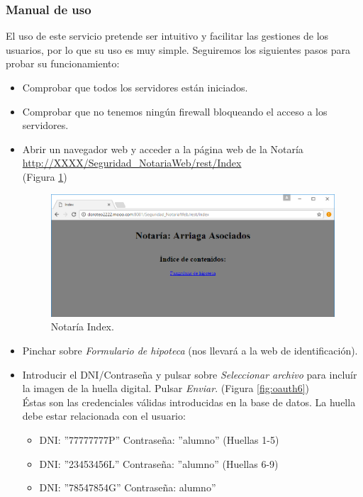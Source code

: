 \documentclass[a4,12pt,onecolum]{article}
\begin{document}

\subsubsection{Manual de uso}

El uso de este servicio pretende ser intuitivo y facilitar las gestiones de los usuarios, por lo que su uso es muy simple. Seguiremos los siguientes pasos para probar su funcionamiento:

\begin{itemize}
	\item Comprobar que todos los servidores están iniciados.

	\item Comprobar que no tenemos ningún firewall bloqueando el acceso a los servidores.

	\item Abrir un navegador web y acceder a la página web de la Notaría \\
		\url{http://XXXX/Seguridad\_NotariaWeb/rest/Index}	\\
		(Figura \ref{fig:oauth5})

\begin{figure}[htbp]
\centering
\includegraphics[width=1.0\textwidth]{./images/oauth/notaria_index.png}
\caption{Notaría Index.}
\label{fig:oauth5}
\end{figure}

	\item Pinchar sobre \emph{Formulario de hipoteca} (nos llevará a la web de identificación).

	\item Introducir el DNI/Contraseña y pulsar sobre \emph{Seleccionar archivo} para incluír la imagen de la 		huella digital. Pulsar \emph{Enviar}. (Figura \ref{fig:oauth6}) \\

	Éstas son las credenciales válidas introducidas en la base de datos. La huella debe estar relacionada con el usuario:
	\begin{itemize}
		\item DNI: ''77777777P'' Contraseña: ''alumno'' (Huellas 1-5)
		\item DNI: ''23453456L'' Contraseña: ''alumno''	(Huellas 6-9)
		\item DNI: ''78547854G'' Contraseña: alumno''
	\end{itemize}


\end{itemize}
\end{document}
